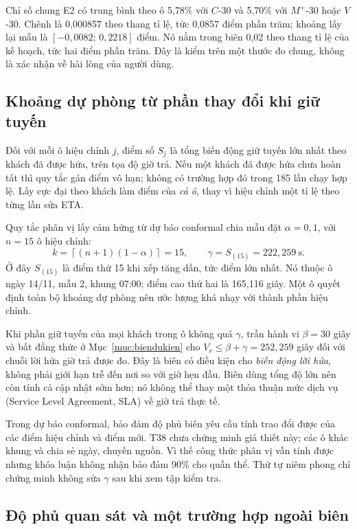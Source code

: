 Chỉ số chung E2 có trung bình theo ô 5,78\% với $C$-30 và 5,70\% với
$M^{+}$-30 hoặc $V$-30. Chênh là 0,000857 theo thang tỉ lệ, tức 0,0857
điểm phần trăm; khoảng lấy lại mẫu là $[-0{,}0082;\,0{,}2218]$ điểm.
Nó nằm trong biên 0,02 theo thang tỉ lệ của kế hoạch, tức hai điểm phần trăm.
Đây là kiểm trên một thước đo chung, không là xác nhận về hài lòng của người dùng.

\subsection{Khoảng dự phòng từ phần thay đổi khi giữ tuyến}

Đối với mỗi ô hiệu chỉnh $j$, điểm số $S_j$ là tổng biến động giữ tuyến lớn
nhất theo khách đã được hứa, trên tọa độ giờ trả. Nếu một khách đã được hứa
chưa hoàn tất thì quy tắc gán điểm vô hạn; không có trường hợp đó trong 185
lần chạy hợp lệ. Lấy cực đại theo khách làm điểm của \emph{cả ô}, thay vì
hiệu chỉnh một tỉ lệ theo từng lần sửa ETA.

Quy tắc phân vị lấy cảm hứng từ dự báo conformal chia mẫu
\cite{angelopoulos2023} đặt $\alpha=0{,}1$, với $n=15$ ô hiệu chỉnh:
\begin{equation}
 k=\left\lceil(n+1)(1-\alpha)\right\rceil=15,\qquad
 \gamma=S_{(15)}=222{,}259\ \text{s}.
\end{equation}
Ở đây $S_{(15)}$ là điểm thứ 15 khi xếp tăng dần, tức điểm lớn nhất. Nó thuộc
ô ngày 14/11, mẫu 2, khung 07:00; điểm cao thứ hai là 165,116 giây. Một ô
quyết định toàn bộ khoảng dự phòng nên ước lượng khá nhạy với thành phần hiệu chỉnh.

Khi phần giữ tuyến của mọi khách trong ô không quá $\gamma$, trần hành vi
$\beta=30$ giây và bất đẳng thức ở Mục~\ref{muc:biendukien} cho
$V_r\le\beta+\gamma=252{,}259$ giây đối với chuỗi lời hứa giờ trả được đo.
Đây là biên có điều kiện cho \emph{biến động lời hứa}, không phải giới hạn
trễ đến nơi so với giờ hẹn đầu. Biên dùng tổng độ lớn nên còn tính cả cập
nhật sớm hơn; nó không thể thay một thỏa thuận mức dịch vụ
(Service Level Agreement, SLA) về giờ trả thực tế.

Trong dự báo conformal, bảo đảm độ phủ biên yêu cầu tính trao đổi được của
các điểm hiệu chỉnh và điểm mới. T38 chưa chứng minh giả thiết này; các ô
khác khung và chia sẻ ngày, chuyến nguồn. Vì thế công thức phân vị vẫn tính
được nhưng khóa luận không nhận bảo đảm 90\% cho quần thể. Thứ tự niêm phong
chỉ chứng minh không sửa $\gamma$ sau khi xem tập kiểm tra.

\subsection{Độ phủ quan sát và một trường hợp ngoài biên}

